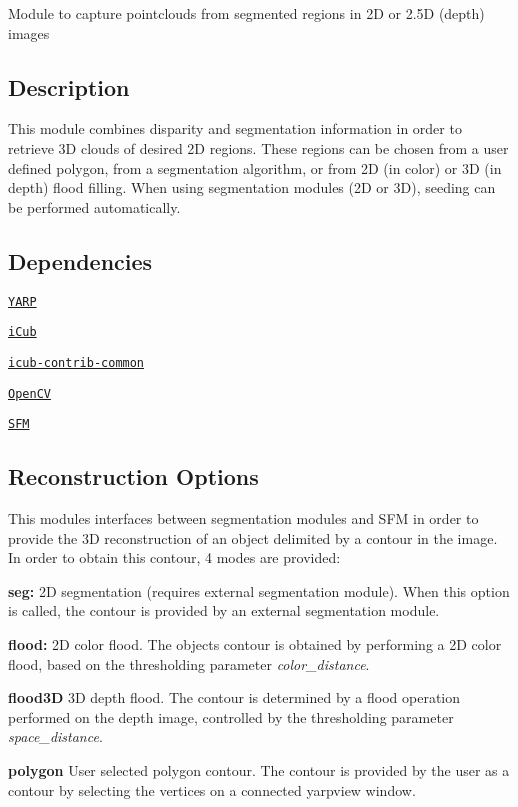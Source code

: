 Module to capture pointclouds from segmented regions in 2D or 2.\+5D (depth) images

\subsection*{Description}

This module combines disparity and segmentation information in order to retrieve 3D clouds of desired 2D regions. These regions can be chosen from a user defined polygon, from a segmentation algorithm, or from 2D (in color) or 3D (in depth) flood filling. When using segmentation modules (2D or 3D), seeding can be performed automatically.

\subsection*{Dependencies}


\begin{DoxyItemize}
\item \href{https://github.com/robotology/yarp}{\tt Y\+A\+RP}
\item \href{https://github.com/robotology/icub-main}{\tt i\+Cub}
\item \href{https://github.com/robotology/icub-contrib-common}{\tt icub-\/contrib-\/common}
\item \href{http://opencv.org/}{\tt Open\+CV}
\item \href{https://github.com/robotology/stereo-vision}{\tt S\+FM}
\end{DoxyItemize}

\subsection*{Reconstruction Options}

This modules interfaces between segmentation modules and S\+FM in order to provide the 3D reconstruction of an object delimited by a contour in the image. In order to obtain this contour, 4 modes are provided\+:


\begin{DoxyItemize}
\item {\bfseries seg\+:} 2D segmentation (requires external segmentation module). When this option is called, the contour is provided by an external segmentation module.
\item {\bfseries flood\+:} 2D color flood. The object\textquotesingle{}s contour is obtained by performing a 2D color flood, based on the thresholding parameter {\itshape color\+\_\+distance}.
\item {\bfseries flood3D} 3D depth flood. The contour is determined by a flood operation performed on the depth image, controlled by the thresholding parameter {\itshape space\+\_\+distance}.
\item {\bfseries polygon} User selected polygon contour. The contour is provided by the user as a contour by selecting the vertices on a connected yarpview window.
\end{DoxyItemize}

